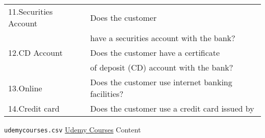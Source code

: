 \documentclass[12pt]{article}
\theoremstyle{remark}
\begin{document}
\begin{table}
\begin{tabular}{l|l}
11.Securities Account & Does the customer \\
& have a securities account with the bank?\\

12.CD Account & Does the customer have a certificate\\
& of deposit (CD) account with the bank?\\

13.Online & Does the customer use internet banking facilities?\\

14.Credit card & Does the customer use a credit card issued by\\
	\hline
	\end{tabular}
\end{table}




\begin{table}
	\caption{ \texttt{udemycourses.csv}
\href{https://www.kaggle.com/datasets/andrewmvd/udemy-courses?resource=download}{Udemy Courses} Content
}
\end{table}








\newpage
\end{document}
